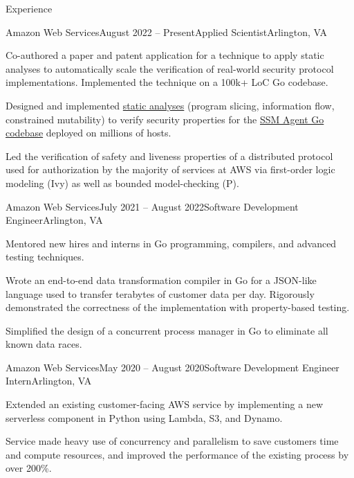 \documentclass{resume}
\begin{document}
\vspace{-1em}
\begin{rSection}{Experience}

  \begin{rSubsection}{Amazon Web Services}{August 2022 -- Present}{Applied Scientist}{Arlington, VA}
    \item Co-authored a paper and patent application for a technique to apply static analyses to automatically scale the verification of real-world security protocol implementations. Implemented the technique on a 100k+ LoC Go codebase.
    \item Designed and implemented \href{https://github.com/awslabs/ar-go-tools}{static analyses} (program slicing, information flow, constrained mutability) to verify security properties for the \href{https://github.com/aws/amazon-ssm-agent}{SSM Agent Go codebase} deployed on millions of hosts.
    \item Led the verification of safety and liveness properties of a distributed protocol used for authorization by the majority of services at AWS via first-order logic modeling (Ivy) as well as bounded model-checking (P).
  \end{rSubsection}

  \begin{rSubsection}{Amazon Web Services}{July 2021 -- August 2022}{Software Development Engineer}{Arlington, VA}
    \item Mentored new hires and interns in Go programming, compilers, and advanced testing techniques.
    \item Wrote an end-to-end data transformation compiler in Go for a JSON-like language used to transfer terabytes of customer data per day. Rigorously demonstrated the correctness of the implementation with property-based testing.
    \item Simplified the design of a concurrent process manager in Go to eliminate all known data races.
  \end{rSubsection}

  \begin{rSubsection}{Amazon Web Services}{May 2020 -- August 2020}{Software Development Engineer Intern}{Arlington, VA}
    \item Extended an existing customer-facing AWS service by implementing a new serverless component in Python using Lambda, S3, and Dynamo.
    \item Service made heavy use of concurrency and parallelism to save customers time and compute resources, and improved the performance of the existing process by over 200\%.
  \end{rSubsection}

\end{rSection}
\end{document}
